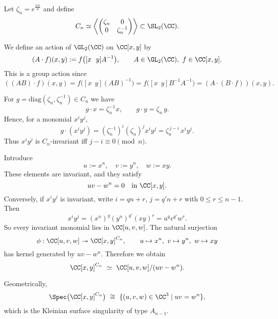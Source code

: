 \documentclass[leqno]{ltjsarticle}
\begin{document}
Let $\zeta_n = e^{\frac{2\pi i}{n}}$ and define
\[
C_n \simeq \left\langle 
  \begin{pmatrix}
    \zeta_n & 0 \\
    0 & \zeta_n^{-1}
  \end{pmatrix}
\right\rangle \subset \SL_2(\CC).
\]

\noindent
We define an action of $\GL_2(\CC)$ on $\CC[x,y]$ by
\[
(A \cdot f)(x,y) := f\big([x\ \ y]A^{-1}\big), 
\qquad A \in \GL_2(\CC),\ f \in \CC[x,y].
\]
This is a group action since
\[
((AB)\cdot f)(x,y)
= f\big([x\ \ y](AB)^{-1}\big)
= f\big([x\ \ y]B^{-1}A^{-1}\big)
= (A \cdot (B \cdot f))(x,y).
\]

\medskip

For $g=\mathrm{diag}(\zeta_n,\zeta_n^{-1}) \in C_n$ we have
\[
g \cdot x = \zeta_n^{-1}x,
\qquad 
g \cdot y = \zeta_n\,y.
\]
Hence, for a monomial $x^i y^j$,
\[
g \cdot (x^i y^j) 
= (\zeta_n^{-1})^i (\zeta_n)^j x^i y^j
= \zeta_n^{\,j-i}\,x^i y^j.
\]
Thus $x^i y^j$ is $C_n$-invariant iff $j-i \equiv 0 \pmod{n}$.

\medskip

Introduce
\[
u := x^n,\quad v := y^n,\quad w := xy.
\]
These elements are invariant, and they satisfy
\[
uv - w^n = 0 \quad \text{in } \CC[x,y].
\]
Conversely, if $x^i y^j$ is invariant, write $i = qn + r$, $j = q'n + r$ with $0 \le r \le n-1$. Then
\[
x^i y^j = (x^n)^q (y^n)^{q'} (xy)^r = u^q v^{q'} w^r.
\]
So every invariant monomial lies in $\CC[u,v,w]$. The natural surjection
\[
\phi : \CC[u,v,w] \twoheadrightarrow \CC[x,y]^{C_n},\qquad
u \mapsto x^n,\ v \mapsto y^n,\ w \mapsto xy
\]
has kernel generated by $uv-w^n$. Therefore we obtain
\[
\CC[x,y]^{C_n} \ \simeq\ \CC[u,v,w]/(uv-w^n).
\]

\medskip

Geometrically,
\[
\Spec \big(\CC[x,y]^{C_n}\big)
\ \cong\ 
\{(u,v,w)\in \CC^3 \mid uv=w^n\},
\]
which is the Kleinian surface singularity of type $A_{n-1}$.
\end{document}
